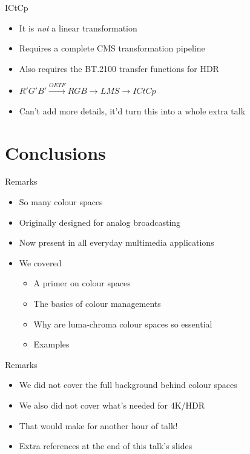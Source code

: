 \documentclass[aspectratio=169,handout,usepdftitle=false]{fireshonks}
\begin{document}
\begin{frame}{ICtCp}
    \begin{itemize}
        \item It is \emph{not} a linear transformation
        \item Requires a complete CMS transformation pipeline
        \item Also requires the BT.2100 transfer functions for HDR
        \item $R'G'B' \xrightarrow{OETF} RGB \to LMS \to ICtCp$
        \item Can't add more details, it'd turn this into a whole extra talk 
    \end{itemize}
\end{frame}
\section{Conclusions}
\begin{frame}{Remarks}
    \begin{itemize}
        \item So many colour spaces
        \item Originally designed for analog broadcasting
        \item Now present in all everyday multimedia applications
        \item We covered
              \begin{itemize}
                  \item A primer on colour spaces
                  \item The basics of colour managements
                  \item Why are luma-chroma colour spaces so essential
                  \item Examples
              \end{itemize}
    \end{itemize}
\end{frame}
\begin{frame}{Remarks}
    \begin{itemize}
        \item We did not cover the full background behind colour spaces
        \item We also did not cover what's needed for 4K/HDR
        \item That would make for another hour of talk!
        \item Extra references at the end of this talk's slides
    \end{itemize}
\end{frame}
\end{document}

